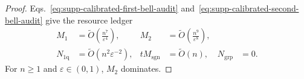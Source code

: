 \documentclass[
  aps,
  prx,
  reprint,
  superscriptaddress,
  amsmath,
  amssymb,
  nofootinbib,
  longbibliography
]{revtex4-2}
\begin{document}
\begin{proof}
Eqs.~\eqref{eq:supp-calibrated-first-bell-audit} and~\eqref{eq:supp-calibrated-second-bell-audit} give the resource ledger
\begin{equation}
\begin{aligned}
M_1&=\widetilde O\!\left(\frac{n^7}{\varepsilon^4}\right),
&
M_2&=\widetilde O\!\left(\frac{n^9}{\varepsilon^8}\right),
\\
N_{1\mathrm q}&=\widetilde O(n^2\varepsilon^{-2}),
&
tM_{\mathrm{sgn}}&=\widetilde O(n),
&
N_{\mathrm{grp}}&=0.
\end{aligned}
\end{equation}
For \(n\ge1\) and \(\varepsilon\in(0,1)\), \(M_2\) dominates.
\end{proof}

\end{document}

